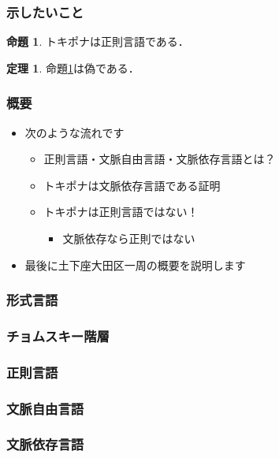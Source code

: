 \documentclass[14pt]{beamer}
\theoremstyle{definition}
\newtheorem{thm}{定理}
\newtheorem{prop}{命題}
\begin{document}
\begin{frame}
	\frametitle{示したいこと}

	\begin{tcolorbox}[
			colframe=orange!80,
			colback=orange!20,
			sharp corners]
		\begin{prop}\label{prop:pona}
			トキポナは正則言語である．
		\end{prop}

		\begin{thm}
			命題\ref{prop:pona}は偽である．
		\end{thm}
	\end{tcolorbox}

\end{frame}


\begin{frame}
	\frametitle{概要}

	\begin{itemize}
		\item 次のような流れです
			\begin{itemize}
				\item 正則言語・文脈自由言語・文脈依存言語とは？
				\item トキポナは文脈依存言語である証明
				\item トキポナは正則言語ではない！
					\begin{itemize}
						\item 文脈依存なら正則ではない
					\end{itemize}
			\end{itemize}
		\item 最後に土下座大田区一周の概要を説明します
	\end{itemize}

\end{frame}


\begin{frame}
	\frametitle{形式言語}
\end{frame}


\begin{frame}
	\frametitle{チョムスキー階層}
\end{frame}


\begin{frame}
	\frametitle{正則言語}
\end{frame}


\begin{frame}
	\frametitle{文脈自由言語}
\end{frame}


\begin{frame}
	\frametitle{文脈依存言語}
\end{frame}
\end{document}
